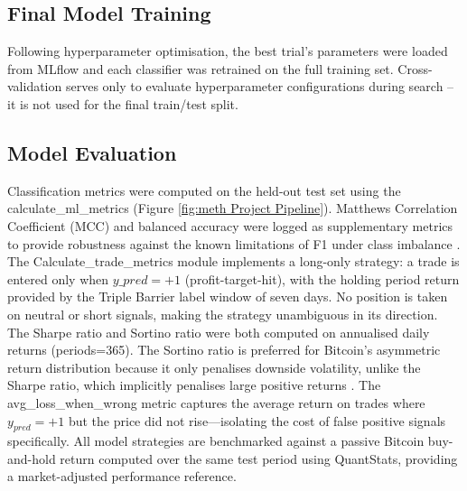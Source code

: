 \subsection{Final Model Training}
Following hyperparameter optimisation, the best trial's parameters were loaded from MLflow and each classifier was retrained on the full training set. Cross-validation serves only to evaluate hyperparameter configurations during search -- it is not used for the final train/test split.
\subsection{Model Evaluation}
Classification metrics were computed on the held-out test set using the calculate\_ml\_metrics (Figure \ref{fig:meth Project Pipeline}). Matthews Correlation Coefficient (MCC) and balanced accuracy were logged as supplementary metrics to provide robustness against the known limitations of F1 under class imbalance \cite{chiccoAdvantagesMatthewsCorrelation2020}. 
The Calculate\_trade\_metrics module implements a long-only strategy: a trade is entered only when $y\_{pred} = +1$ (profit-target-hit), with the holding period return provided by the Triple Barrier label window of seven days. No position is taken on neutral or short signals, making the strategy unambiguous in its direction. The Sharpe ratio and Sortino ratio were both computed on annualised daily returns (periods=365). The Sortino ratio is preferred for Bitcoin's asymmetric return distribution because it only penalises downside volatility, unlike the Sharpe ratio, which implicitly penalises large positive returns \cite{DownsideRiskProQuest}. The avg\_loss\_when\_wrong metric captures the average return on trades where $y_{pred} = +1$ but the price did not rise—isolating the cost of false positive signals specifically. All model strategies are benchmarked against a passive Bitcoin buy-and-hold return computed over the same test period using QuantStats, providing a market-adjusted performance reference.
